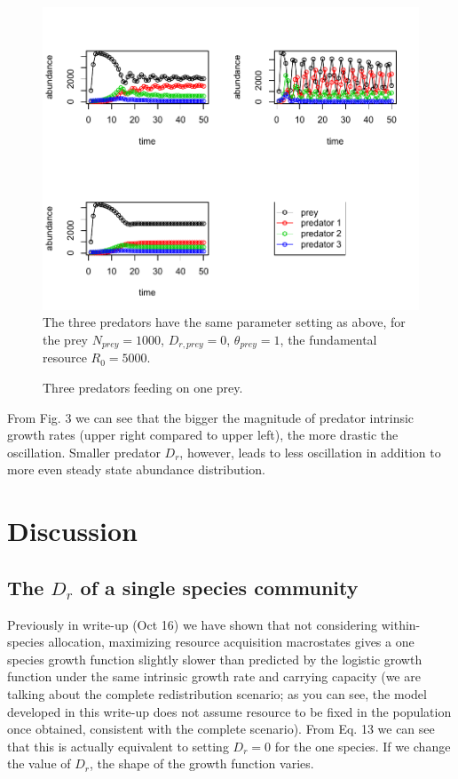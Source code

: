\documentclass[12pt]{article}
\begin{document}
\begin{figure}
\caption{Three predators feeding on one prey.}
\includegraphics[width=\textwidth]{integrated_multi_predators.pdf}
The three predators have the same parameter setting as above, for the prey $N_{prey}=1000$, $D_{r,prey}=0$, $\theta_{prey}=1$, the fundamental resource $R_0= 5000$.
\end{figure}

From Fig. 3 we can see that the bigger the magnitude of predator intrinsic growth rates (upper right compared to upper left), the more drastic the oscillation. Smaller predator $D_r$, however, leads to less oscillation in addition to more even steady state abundance distribution.

\section{Discussion}
\subsection{The $D_r$ of a single species community}
Previously in write-up (Oct 16) we have shown that not considering within-species allocation, maximizing resource acquisition macrostates gives a one species growth function slightly slower than predicted by the logistic growth function under the same intrinsic growth rate and carrying capacity (we are talking about the complete redistribution scenario; as you can see, the model developed in this write-up does not assume resource to be fixed in the population once obtained, consistent with the complete scenario). From Eq. 13 we can see that this is actually equivalent to setting $D_r=0$ for the one species. If we change the value of $D_r$, the shape of the growth function varies.
\end{document}
